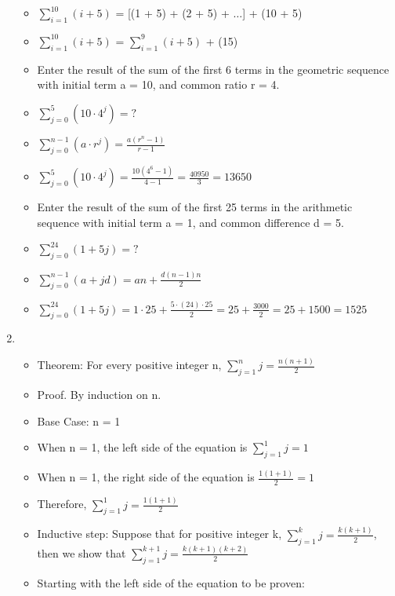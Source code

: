 \documentclass[12pt,a4paper]{article}
\begin{document}
\begin{enumerate}
\begin{itemize}
    \item[] \(\displaystyle\sum_{i = 1}^{10} (i + 5) \) = [(1 + 5) + (2 + 5) + \(\ldots \)] + (10 + 5)
    \item[] \(\displaystyle\sum_{i = 1}^{10} (i + 5) \) =  \(\displaystyle\sum_{i = 1}^{9} (i + 5) \) + (15)
    \item Enter the result of the sum of the first 6 terms in the geometric sequence with initial term a = 10, and common ratio r = 4.
    \item[] \(\displaystyle\sum_{j=0}^{5} (10 \cdot 4^{j}) = ? \)
    \item[] \(\displaystyle\sum_{j=0}^{n-1} (a \cdot r^j) = \frac{a(r^n-1)}{r-1} \)
    \item[] \(\displaystyle\sum_{j=0}^{5} (10 \cdot 4^j) = \frac{10(4^6-1)}{4-1} = \frac{40950}{3} = 13650 \)
    \item Enter the result of the sum of the first 25 terms in the arithmetic sequence with initial term a = 1, and common difference d = 5.
    \item[] \(\displaystyle\sum_{j=0}^{24} (1 + 5j) = ? \) 
    \item[] \(\displaystyle\sum_{j=0}^{n-1} (a + jd) = an + \frac{d(n-1)n}{2} \) 
    \item[] \(\displaystyle\sum_{j=0}^{24} (1 + 5j) = 1\cdot 25 + \frac{5 \cdot (24)  \cdot 25}{2} = 25 + \frac{3000}{2} = 25 + 1500 = 1525\) 
  \end{itemize}
  \item {} 
  \begin{itemize}
    \item Theorem: For every positive integer n, \(\displaystyle\sum_{j=1}^{n} j = \frac{n(n+1)}{2} \)
    \item Proof. By induction on n.
    \item Base Case: n = 1
    \item[] When n = 1, the left side of the equation is \(\displaystyle\sum_{j=1}^{1} j = 1\) 
    \item[] When n = 1, the right side of the equation is \(\frac{1(1+1)}{2} = 1\)
    \item[] Therefore, \(\displaystyle\sum_{j=1}^{1} j = \frac{1(1+1)}{2}\)
    \item Inductive step: Suppose that for positive integer k, \(\displaystyle\sum_{j=1}^{k} j = \frac{k(k+1)}{2}\), then we show that \(\displaystyle\sum_{j=1}^{k+1} j = \frac{k(k+1)(k+2)}{2}\)
    \item Starting with the left side of the equation to be proven:

\end{itemize}
\end{enumerate}
\end{document}
